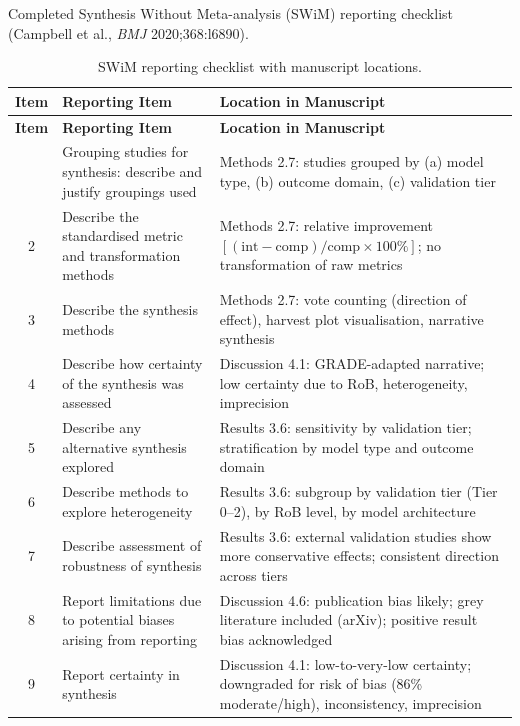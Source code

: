 \documentclass[11pt,a4paper]{article}
\begin{document}
\noindent Completed Synthesis Without Meta-analysis (SWiM) reporting checklist (Campbell et al., \textit{BMJ} 2020;368:l6890).

\begin{small}
\begin{longtable}{@{}cp{5.5cm}p{8cm}@{}}
\caption{SWiM reporting checklist with manuscript locations.} \\
\toprule
\textbf{Item} & \textbf{Reporting Item} & \textbf{Location in Manuscript} \\
\midrule
\endfirsthead
\toprule
\textbf{Item} & \textbf{Reporting Item} & \textbf{Location in Manuscript} \\
\midrule
\endhead
\bottomrule
\endlastfoot
1 & Grouping studies for synthesis: describe and justify groupings used & Methods 2.7: studies grouped by (a) model type, (b) outcome domain, (c) validation tier \\
2 & Describe the standardised metric and transformation methods & Methods 2.7: relative improvement $[(\text{int}-\text{comp})/\text{comp} \times 100\%]$; no transformation of raw metrics \\
3 & Describe the synthesis methods & Methods 2.7: vote counting (direction of effect), harvest plot visualisation, narrative synthesis \\
4 & Describe how certainty of the synthesis was assessed & Discussion 4.1: GRADE-adapted narrative; low certainty due to RoB, heterogeneity, imprecision \\
5 & Describe any alternative synthesis explored & Results 3.6: sensitivity by validation tier; stratification by model type and outcome domain \\
6 & Describe methods to explore heterogeneity & Results 3.6: subgroup by validation tier (Tier 0--2), by RoB level, by model architecture \\
7 & Describe assessment of robustness of synthesis & Results 3.6: external validation studies show more conservative effects; consistent direction across tiers \\
8 & Report limitations due to potential biases arising from reporting & Discussion 4.6: publication bias likely; grey literature included (arXiv); positive result bias acknowledged \\
9 & Report certainty in synthesis & Discussion 4.1: low-to-very-low certainty; downgraded for risk of bias (86\% moderate/high), inconsistency, imprecision \\
\end{longtable}
\end{small}
\end{document}
